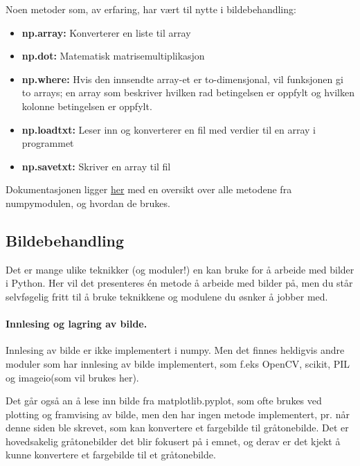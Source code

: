 \documentclass[%
oneside,                 %
final,                   %
10pt]{article}
\begin{document}
Noen metoder som, av erfaring, har vært til nytte i bildebehandling:
\begin{itemize}
\item \textbf{np.array:} Konverterer en liste til array

\item \textbf{np.dot:} Matematisk matrisemultiplikasjon

\item \textbf{np.where:} 
Hvis den innsendte array-et er to-dimensjonal, vil funksjonen gi to arrays; en array som beskriver hvilken rad betingelsen er oppfylt og hvilken kolonne betingelsen er oppfylt. 

\item \textbf{np.loadtxt:} Leser inn og konverterer en fil med verdier til en array i programmet

\item \textbf{np.savetxt:} Skriver en array til fil
\end{itemize}

\noindent
Dokumentasjonen ligger \href{{https://docs.scipy.org/doc/numpy/reference/}}{her} med en oversikt over alle metodene fra numpymodulen, og hvordan de brukes.


\subsection{Bildebehandling}
Det er mange ulike teknikker (og moduler!) en kan bruke for å arbeide med bilder i Python. Her vil det presenteres én metode å arbeide med bilder på, men
du står selvføgelig fritt til å bruke teknikkene og modulene du øsnker å jobber med.

\paragraph{Innlesing og lagring av bilde.}
Innlesing av bilde er ikke implementert i numpy. Men det finnes heldigvis andre moduler som har innlesing av bilde implementert, som f.eks OpenCV, scikit, PIL og imageio(som vil brukes her).

Det går også an å lese inn bilde fra matplotlib.pyplot, som ofte brukes ved plotting og framvising av bilde, men den har ingen metode implementert, pr. når denne siden ble skrevet, som kan konvertere et fargebilde til gråtonebilde.
Det er hovedsakelig gråtonebilder det blir fokusert på i emnet, og derav er det kjekt å kunne konvertere et fargebilde til et gråtonebilde.
\end{document}
